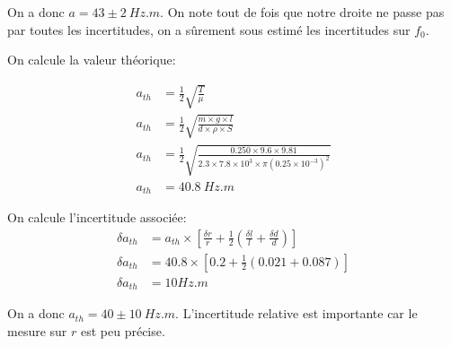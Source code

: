 \documentclass[11pt]{article}
\begin{document}
On a donc $a=43 \pm 2 \ Hz.m$. On note tout de fois que notre droite ne passe pas par toutes les incertitudes, on a sûrement sous estimé les incertitudes sur $f_0$.

\newpage
On calcule la valeur théorique:

\begin{align*}
    a_{th} &= \frac{1}{2} \sqrt{\frac{T}{\mu}}\\
    a_{th}&=\frac{1}{2} \sqrt{\frac{m \times g \times l}{d \times \rho \times S}} \\
    a_{th}&=\frac{1}{2} \sqrt{\frac{0.250 \times 9.6 \times 9.81}{2.3 \times 7.8 \times 10^{3} \times \pi (0.25 \times 10^{-3})^2}} \\
    a_{th}&= 40.8 \ Hz.m
\end{align*}

On calcule l'incertitude associée:
\begin{align*}
    \delta a_{th} &= a_{th} \times [\frac{\delta r}{r}+\frac{1}{2}\left(\frac{\delta l}{l}+ \frac{\delta d}{d}\right)] \\
    \delta a_{th} &= 40.8 \times [0.2 + \frac{1}{2}\left(0.021+0.087\right)] \\
    \delta a_{th} &= 10 Hz.m
\end{align*}

On a donc $a_{th}=40\pm 10 \ Hz.m$. L'incertitude relative est importante car le mesure sur $r$ est peu précise. 
\end{document}
